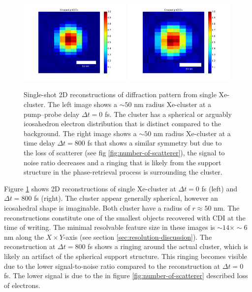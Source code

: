 \begin{figure}
	\centering
		\includegraphics[width=0.49\textwidth]{images/results/Xe_0_fs.png}
		\includegraphics[width=0.49\textwidth]{images/results/Xe_800_fs.png}
	\caption[Single-shot 2D reconstructions of $\sim 50$ nm radius Xe-cluster.]{Single-shot 2D reconstructions of diffraction pattern from single Xe-cluster. The left image shows a $\sim 50$ nm radius Xe-cluster at a pump--probe delay $\Delta t=0$ fs. The cluster has a spherical or arguably icosahedron electron distribution that is distinct compared to the background. The right image shows a $\sim 50$ nm radius Xe-cluster at a time delay $\Delta t=800$ fs that shows a similar symmetry but due to the loss of scatterer (see fig \ref{fig:number-of-scatterer}), the signal to noise ratio decreases and a ringing that is likely from the support structure in the phase-retrieval process is surrounding the cluster.}
	\label{fig:Xe-2D-reconstructions}
\end{figure}
Figure \ref{fig:Xe-2D-reconstructions} shows 2D reconstructions of single Xe-cluster at $\Delta t = 0$ fs (left) and $\Delta t=800$ fs (right). The cluster appear generally spherical, however an icosahedral shape is imaginable. Both cluster have a radius of $r\approx 50$ nm. The reconstructions constitute one of the smallest objects recovered with CDI at the time of writing. The minimal resolvable feature size in these images is $\sim 14\times \sim 6$ nm along the $X\times Y$-axis (see section \ref{sec:resolution-discussion}). The reconstruction at $\Delta t=800$ fs shows a ringing around the actual cluster, which is likely an artifact of the spherical support structure. This ringing becomes visible due to the lower signal-to-noise ratio compared to the reconstruction at $\Delta t=0$ fs. The lower signal is due to the in figure \ref{fig:number-of-scatterer} described loss of electrons.
%
%
%
